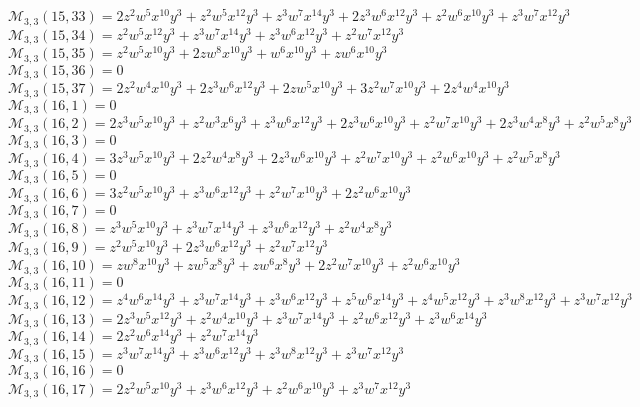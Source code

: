 \documentclass[12pt]{memoireuqam1.3}
\begin{document}
$\mathcal{M}_{3,3}(15,33)=2z^2w^5x^{10}y^3+z^2w^5x^{12}y^3+z^3w^7x^{14}y^3+2z^3w^6x^{12}y^3+z^2w^6x^{10}y^3+z^3w^7x^{12}y^3$\\
$\mathcal{M}_{3,3}(15,34)=z^2w^5x^{12}y^3+z^3w^7x^{14}y^3+z^3w^6x^{12}y^3+z^2w^7x^{12}y^3$\\
$\mathcal{M}_{3,3}(15,35)=z^2w^5x^{10}y^3+2zw^8x^{10}y^3+w^6x^{10}y^3+zw^6x^{10}y^3$\\
$\mathcal{M}_{3,3}(15,36)=0$\\
$\mathcal{M}_{3,3}(15,37)=2z^2w^4x^{10}y^3+2z^3w^6x^{12}y^3+2zw^5x^{10}y^3+3z^2w^7x^{10}y^3+2z^4w^4x^{10}y^3$\\
$\mathcal{M}_{3,3}(16,1)=0$\\
$\mathcal{M}_{3,3}(16,2)=2z^3w^5x^{10}y^3+z^2w^3x^6y^3+z^3w^6x^{12}y^3+2z^3w^6x^{10}y^3+z^2w^7x^{10}y^3+2z^3w^4x^8y^3+z^2w^5x^8y^3$\\
$\mathcal{M}_{3,3}(16,3)=0$\\
$\mathcal{M}_{3,3}(16,4)=3z^3w^5x^{10}y^3+2z^2w^4x^8y^3+2z^3w^6x^{10}y^3+z^2w^7x^{10}y^3+z^2w^6x^{10}y^3+z^2w^5x^8y^3$\\
$\mathcal{M}_{3,3}(16,5)=0$\\
$\mathcal{M}_{3,3}(16,6)=3z^2w^5x^{10}y^3+z^3w^6x^{12}y^3+z^2w^7x^{10}y^3+2z^2w^6x^{10}y^3$\\
$\mathcal{M}_{3,3}(16,7)=0$\\
$\mathcal{M}_{3,3}(16,8)=z^3w^5x^{10}y^3+z^3w^7x^{14}y^3+z^3w^6x^{12}y^3+z^2w^4x^8y^3$\\
$\mathcal{M}_{3,3}(16,9)=z^2w^5x^{10}y^3+2z^3w^6x^{12}y^3+z^2w^7x^{12}y^3$\\
$\mathcal{M}_{3,3}(16,10)=zw^8x^{10}y^3+zw^5x^8y^3+zw^6x^8y^3+2z^2w^7x^{10}y^3+z^2w^6x^{10}y^3$\\
$\mathcal{M}_{3,3}(16,11)=0$\\
$\mathcal{M}_{3,3}(16,12)=z^4w^6x^{14}y^3+z^3w^7x^{14}y^3+z^3w^6x^{12}y^3+z^5w^6x^{14}y^3+z^4w^5x^{12}y^3+z^3w^8x^{12}y^3+z^3w^7x^{12}y^3$\\
$\mathcal{M}_{3,3}(16,13)=2z^3w^5x^{12}y^3+z^2w^4x^{10}y^3+z^3w^7x^{14}y^3+z^2w^6x^{12}y^3+z^3w^6x^{14}y^3$\\
$\mathcal{M}_{3,3}(16,14)=2z^2w^6x^{14}y^3+z^2w^7x^{14}y^3$\\
$\mathcal{M}_{3,3}(16,15)=z^3w^7x^{14}y^3+z^3w^6x^{12}y^3+z^3w^8x^{12}y^3+z^3w^7x^{12}y^3$\\
$\mathcal{M}_{3,3}(16,16)=0$\\
$\mathcal{M}_{3,3}(16,17)=2z^2w^5x^{10}y^3+z^3w^6x^{12}y^3+z^2w^6x^{10}y^3+z^3w^7x^{12}y^3$\\
\end{document}
